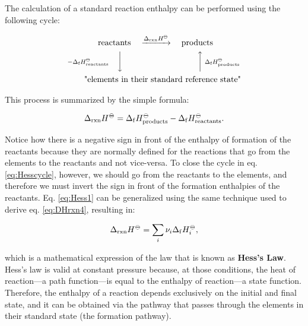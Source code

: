 \documentclass[
]{book}
\theoremstyle{definition}
\theoremstyle{definition}
\theoremstyle{definition}
\theoremstyle{remark}
\begin{document}
The calculation of a standard reaction enthalpy can be performed using the following cycle:

\begin{equation}
\begin{aligned}
 \text{reactants} & \quad \xrightarrow{\Delta_{\text{rxn}} H^{-\kern-6pt{\ominus}\kern-6pt-}} \quad \text{products} \\
\scriptstyle{-\Delta_{\text{f}} H_{\text{reactants}}^{-\kern-6pt{\ominus}\kern-6pt-}} \quad \bigg\downarrow \quad & \qquad \qquad \qquad \qquad \scriptstyle{\bigg\uparrow  \; \Delta_{\text{f}} H_{\text{products}}^{-\kern-6pt{\ominus}\kern-6pt-}} \\
 \text{"elements in } & \text{their standard reference state"}
\end{aligned}
\label{eq:Hesscycle}
\end{equation}

This process is summarized by the simple formula:

\begin{equation}
  \Delta_{\text{rxn}} H^{-\kern-6pt{\ominus}\kern-6pt-}= \Delta_{\mathrm{f}} H_{\text{products}}^{-\kern-6pt{\ominus}\kern-6pt-}- \Delta_{\mathrm{f}} H_{\text{reactants}}^{-\kern-6pt{\ominus}\kern-6pt-}.
  \label{eq:Hess1}
\end{equation}

Notice how there is a negative sign in front of the enthalpy of formation of the reactants because they are normally defined for the reactions that go from the elements to the reactants and not vice-versa. To close the cycle in eq. \eqref{eq:Hesscycle}, however, we should go from the reactants to the elements, and therefore we must invert the sign in front of the formation enthalpies of the reactants. Eq. \eqref{eq:Hess1} can be generalized using the same technique used to derive eq. \eqref{eq:DHrxn4}, resulting in:

\begin{equation}
  \Delta_{\text{rxn}} H^{-\kern-6pt{\ominus}\kern-6pt-}= \sum_i \nu_i \Delta_{\mathrm{f}} H_i^{-\kern-6pt{\ominus}\kern-6pt-},
  \label{eq:Hess}
\end{equation}

which is a mathematical expression of the law that is known as \textbf{Hess's Law}. Hess's law is valid at constant pressure because, at those conditions, the heat of reaction---a path function---is equal to the enthalpy of reaction---a state function. Therefore, the enthalpy of a reaction depends exclusively on the initial and final state, and it can be obtained via the pathway that passes through the elements in their standard state (the formation pathway).
\end{document}
